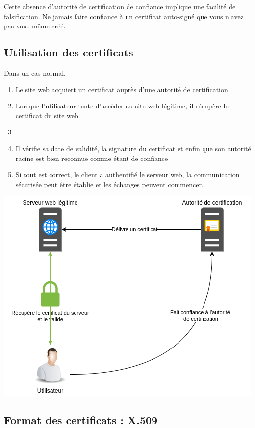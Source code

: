 \documentclass[french, 12pt]{article}%
\begin{document}
Cette absence d’autorité de certification de confiance implique une facilité de falsification. Ne jamais faire confiance à un certificat auto-signé que vous n’avez pas vous même créé.


\subsection{Utilisation des certificats}

Dans un cas normal, 
\begin{enumerate}
\item Le site web acquiert un certificat auprès d’une autorité de certification
\item Lorsque l’utilisateur tente d’accèder au site web légitime, il récupère le certificat du site web
\item \item Il vérifie sa date de validité, la signature du certificat et enfin que son autorité racine est bien reconnue comme étant de confiance
\item Si tout est correct, le client a authentifié le serveur web, la communication sécurisée peut être établie et les échanges peuvent commencer.
\end{enumerate}


\begin{center}
\includegraphics[scale=0.7]{./ressource/certifcatUtilisation}
\end{center}



\subsection{Format des certificats : X.509}
\end{document}
